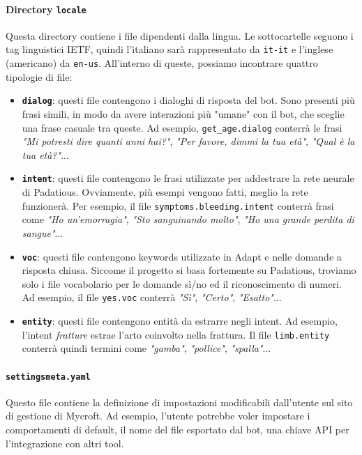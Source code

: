 \paragraph{Directory \texttt{locale}}
Questa directory contiene i file dipendenti dalla lingua. Le sottocartelle seguono i tag linguistici IETF, quindi l'italiano sarà rappresentato da \texttt{it-it} e l'inglese (americano) da \texttt{en-us}. All'interno di queste, possiamo incontrare quattro tipologie di file:
\begin{itemize}
    \item \textbf{\texttt{dialog}}: questi file contengono i dialoghi di risposta del bot. Sono presenti più frasi simili, in modo da avere interazioni più "umane" con il bot, che sceglie una frase casuale tra queste. Ad esempio, \texttt{get\_age.dialog} conterrà le frasi \textit{"Mi potresti dire quanti anni hai?"}, \textit{"Per favore, dimmi la tua età"}, \textit{"Qual è la tua età?"}...
    \item \textbf{\texttt{intent}}: questi file contengono le frasi utilizzate per addestrare la rete neurale di Padatious. Ovviamente, più esempi vengono fatti, meglio la rete funzionerà. Per esempio, il file \texttt{symptoms.bleeding.intent} conterrà frasi come \textit{"Ho un'emorragia"}, \textit{"Sto sanguinando molto"}, \textit{"Ho una grande perdita di sangue"}...
    \item \textbf{\texttt{voc}}: questi file contengono keywords utilizzate in Adapt e nelle domande a risposta chiusa. Siccome il progetto si basa fortemente su Padatious, troviamo solo i file vocabolario per le domande sì/no ed il riconoscimento di numeri. Ad esempio, il file \texttt{yes.voc} conterrà \textit{"Sì"}, \textit{"Certo"}, \textit{"Esatto"}...
    \item \textbf{\texttt{entity}}: questi file contengono entità da estrarre negli intent. Ad esempio, l'intent \textit{fratture} estrae l'arto coinvolto nella frattura. Il file \texttt{limb.entity} conterrà quindi termini come \textit{"gamba"}, \textit{"pollice"}, \textit{"spalla"}...
\end{itemize}
\paragraph{\texttt{settingsmeta.yaml}}
Questo file contiene la definizione di impostazioni modificabili dall'utente sul sito di gestione di Mycroft. Ad esempio, l'utente potrebbe voler impostare i comportamenti di default, il nome del file esportato dal bot, una chiave API per l'integrazione con altri tool.
